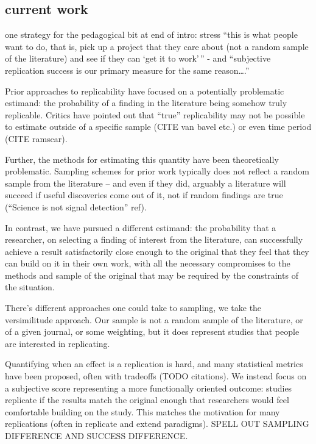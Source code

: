 \documentclass[
  english,
  a4paper,
]{article}
\begin{document}
\hypertarget{current-work}{%
\subsection{current work}\label{current-work}}

one strategy for the pedagogical bit at end of intro: stress ``this is what people want to do, that is, pick up a project that they care about (not a random sample of the literature) and see if they can `get it to work'\,'' - and ``subjective replication success is our primary measure for the same reason\ldots.''

Prior approaches to replicability have focused on a potentially problematic estimand: the probability of a finding in the literature being somehow truly replicable. Critics have pointed out that ``true'' replicability may not be possible to estimate outside of a specific sample (CITE van bavel etc.) or even time period (CITE ramscar).

Further, the methods for estimating this quantity have been theoretically problematic. Sampling schemes for prior work typically does not reflect a random sample from the literature -- and even if they did, arguably a literature will succeed if useful discoveries come out of it, not if random findings are true (``Science is not signal detection'' ref).

In contrast, we have pursued a different estimand: the probability that a researcher, on selecting a finding of interest from the literature, can successfully achieve a result satisfactorily close enough to the original that they feel that they can build on it in their own work, with all the necessary compromises to the methods and sample of the original that may be required by the constraints of the situation.

There's different approaches one could take to sampling, we take the versimilitude approach. Our sample is not a random sample of the literature, or of a given journal, or some weighting, but it does represent studies that people are interested in replicating.

Quantifying when an effect is a replication is hard, and many statistical metrics have been proposed, often with tradeoffs (TODO citations). We instead focus on a subjective score representing a more functionally oriented outcome: studies replicate if the results match the original enough that researchers would feel comfortable building on the study. This matches the motivation for many replications (often in replicate and extend paradigms). SPELL OUT SAMPLING DIFFERENCE AND SUCCESS DIFFERENCE.
\end{document}
